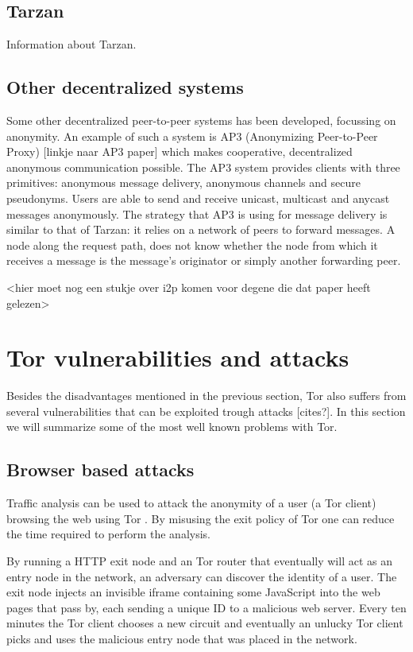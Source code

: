 \documentclass[journal]{IEEEtran}
\begin{document}
		\subsection{Tarzan}
			Information about Tarzan.
		
		\subsection{Other decentralized systems}
			Some other decentralized peer-to-peer systems has been developed, focussing on anonymity. An example of such a system is AP3 (Anonymizing Peer-to-Peer Proxy) [linkje naar AP3 paper] which makes cooperative, decentralized anonymous communication possible. The AP3 system provides clients with three primitives: anonymous message delivery, anonymous channels and secure pseudonyms. Users are able to send and receive unicast, multicast and anycast messages anonymously. The strategy that AP3 is using for message delivery is similar to that of Tarzan: it relies on a network of peers to forward messages. A node along the request path, does not know whether the node from which it receives a message is the message's originator or simply another forwarding peer.
			
			<hier moet nog een stukje over i2p komen voor degene die dat paper heeft gelezen>
		
	\section{Tor vulnerabilities and attacks}
		Besides the disadvantages mentioned in the previous section, Tor also suffers from several vulnerabilities that can be exploited trough attacks [cites?]. In this section we will summarize some of the most well known problems with Tor.

		\subsection{Browser based attacks}
			Traffic analysis can be used to attack the anonymity of a user (a Tor client) browsing the web using Tor \cite{abbott2007browser}. By misusing the exit policy of Tor one can reduce the time required to perform the analysis.
		
			By running a HTTP exit node and an Tor router that eventually will act as an entry node in the network, an adversary can discover the identity of a user. The exit node injects an invisible iframe containing some JavaScript into the web pages that pass by, each sending a unique ID to a malicious web server. Every ten minutes the Tor client chooses a new circuit and eventually an unlucky Tor client picks and uses the malicious entry node that was placed in the network.
		
\end{document}
